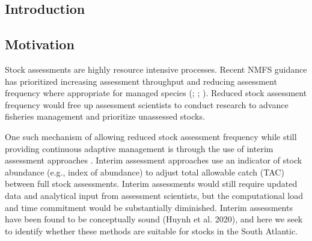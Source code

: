 \documentclass[12pt,english]{article}
\begin{document}
\begin{flushleft}
\begin{spacing}{1.9}
\setlength{\parindent}{1cm} %

\section*{Introduction}

\subsection*{Motivation}
Stock assessments are highly resource intensive processes. Recent NMFS guidance has prioritized increasing assessment throughput and reducing assessment frequency where appropriate for managed species (\citealt{ICES2012}; \citealt{Methot2015}; \citealt{LynchEtAl2018}). Reduced stock assessment frequency would free up assessment scientists to conduct research to advance fisheries management and prioritize unassessed stocks.

One such mechanism of allowing reduced stock assessment frequency while still providing continuous adaptive management is through the use of interim assessment approaches \citep[e.g., ][]{HuynhEtAl2020}. Interim assessment approaches use an indicator of stock abundance (e.g., index of abundance) to adjust total allowable catch (TAC) between full stock assessments. Interim assessments would still require updated data and analytical input from assessment scientists, but the computational load and time commitment would be substantially diminished. Interim assessments have been found to be conceptually sound (Huynh et al. 2020), and here we seek to identify whether these methods are suitable for stocks in the South Atlantic.


\end{spacing}
\end{flushleft}
\end{document}
